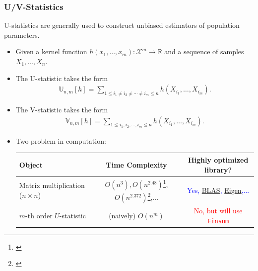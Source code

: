 \documentclass[9pt]{beamer}
\theoremstyle{mystyle}
\theoremstyle{mystyletwo}
\newcommand{\calX}{{\mathcal{X}}}
\def\bbR{\mathbb{R}}
\def\bbR{\mathbb{R}}
\begin{document}
\begin{frame}
    \frametitle{U/V-Statistics}
    U-statistics are generally used to construct unbiased estimators of population parameters.
    \begin{itemize}
        \item Given a kernel function $h(x_1, \ldots, x_m): \calX^m \to \bbR$ and a sequence of samples $X_1, \ldots, X_n$. 
        \item The U-statistic takes the form
              \begin{align*}
                  \mathbb{U}_{n,m}[h] =  \sum_{1 \le i_1 \neq i_2 \neq \cdots \neq i_m \le n} h(X_{i_1}, \ldots, X_{i_m}).
              \end{align*}
        \item The V-statistic takes the form
              \begin{align*}
                  \mathbb{V}_{n,m}[h] =  \sum_{1 \le i_1,i_2,\cdots,i_m \le n} h(X_{i_1}, \ldots, X_{i_m}).
              \end{align*}
        \item Two problem in computation:
            \begin{center}
                \footnotesize
                \begin{tabular}{lcc}
                  \toprule
                  \textbf{Object} &
                  \textbf{Time Complexity} &
                  \textbf{Highly optimized library?} \\
                  \midrule
                Matrix multiplication ($n\times n$) &
                  $O(n^3), O(n^{2.48})$\footnote{\cite{strassen1986asymptotic}},$O(n^{2.372})$\footnote{\cite{williams2024new}},...  &
                  \textcolor{blue}{ Yes, \href{https://www.netlib.org/blas/}{BLAS}, \href{https://libeigen.gitlab.io/}{Eigen},... } \\ [0.8ex]
                    $m$-th order $U$-statistic  &
                  (naively) $O(n^m)$ &
                  \textcolor{red}{ No, but will use \texttt{Einsum}} \\
                  \bottomrule
                \end{tabular}
              \end{center}
    \end{itemize}
\end{frame}
\end{document}
